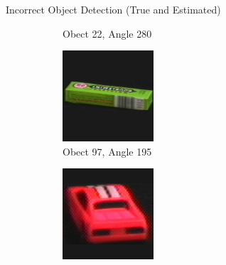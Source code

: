 \documentclass[aspectratio=169, handout, 10pt, hyperref=colorlinks]{beamer}
\begin{document}
\begin{frame}{Incorrect Object Detection (True and Estimated)}
\begin{figure}
\begin{subfigure}{0.32\linewidth}
            \vspace{1em}
            \caption{Obect 22, Angle 280}
        \end{subfigure}
        \begin{subfigure}{0.32\linewidth}
            \centering
            \includegraphics[width = 0.6\linewidth]{incorrect/obj98__195.png}
            \vspace{1em}
            \caption{Obect 97, Angle 195}
        \end{subfigure}
        \begin{subfigure}{0.32\linewidth}
            \centering
            \includegraphics[width = 0.6\linewidth]{incorrect/obj23__80.png}
            \vspace{1em}

\end{subfigure}
\end{figure}
\end{frame}
\end{document}
